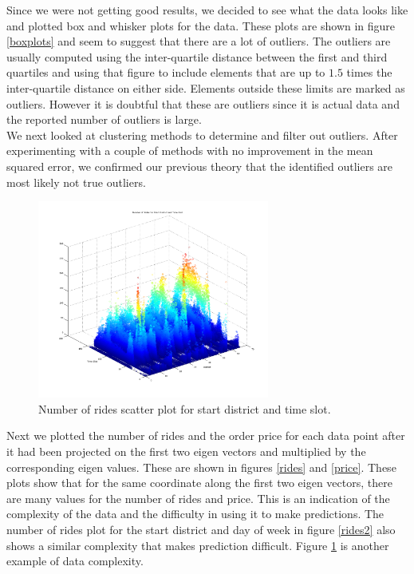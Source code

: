 \documentclass[paper=a4, fontsize=11pt]{scrartcl} %
\numberwithin{equation}{section} %
\numberwithin{table}{section} %
\begin{document}
Since we were not getting good results, we decided to see what the data looks like and plotted box and whisker plots for the data. These plots are shown in figure \ref{boxplots} and seem to suggest that there are a lot of outliers. The outliers are usually computed using the inter-quartile distance between the first and third quartiles and using that figure to include elements that are up to $1.5$ times the inter-quartile distance on either side. Elements outside these limits are marked as outliers. However it is doubtful that these are outliers since it is actual data and the reported number of outliers is large.  \\

We next looked at clustering methods to determine and filter out outliers.  After experimenting with a couple of methods with no improvement in the mean squared error, we confirmed our previous theory that the identified outliers are most likely not true outliers. \\

\begin{figure}[!htb]
\centering
\includegraphics[width=3in]{figures/NumberofRidesforDistrictandTimeSlot.png}
\caption{Number of rides scatter plot for start district and time slot.}
\label{rides3}
\end{figure}

Next we plotted the number of rides and the order price for each data point after it had been projected on the first two eigen vectors and multiplied by the corresponding eigen values. These are shown in figures \ref{rides} and \ref{price}. These plots show that for the same coordinate along the first two eigen vectors, there are many values for the number of rides and price. This is an indication of the complexity of the data and the difficulty in using it to make predictions. The number of rides plot for the start district and day of week in figure \ref{rides2} also shows a similar complexity that makes prediction difficult. Figure \ref{rides3} is another example of data complexity. \\
\end{document}

